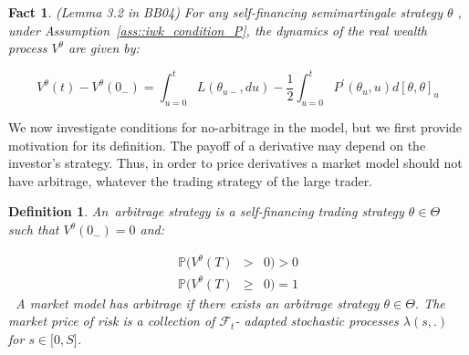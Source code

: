 \documentclass{article}
\newtheorem{definition}{Definition}
\newtheorem{fact}[theorem]{Fact}
\begin{document}


\begin{fact}
(Lemma 3.2 in BB04) For any self-financing semimartingale strategy $\theta $%
, under Assumption~\ref{ass::iwk_condition_P}, the dynamics of the real
wealth process $V^{\theta }$ are given by:
\end{fact}

\begin{equation}
V^{\theta }(t)-V^{\theta }(0_{-})=\int_{u=0}^{t}L(\theta _{u-},du)-\frac{1}{2%
}\int_{u=0}^{t}P^{\prime }(\theta _{u},u)d[\theta ,\theta ]_{u}
\label{lemma32BB04}
\end{equation}%
\bigskip

We now investigate conditions for no-arbitrage in the model, but we first
provide motivation for its definition. The payoff of a derivative may depend
on the investor's strategy. Thus, in order to price derivatives a market
model should not have arbitrage, whatever the trading strategy of the large
trader.

\bigskip


\begin{definition}
An\textit{\ arbitrage strategy} is a self-financing trading strategy $\theta
\in \Theta $ such that $V^{\theta }(0_{-})=0$ and:

\begin{eqnarray*}
\mathbb{P}(V^{\theta }(T) &>&0)>0 \\
\mathbb{P}(V^{\theta }(T) &\geq &0)=1
\end{eqnarray*}%
\bigskip \textbf{\ }A \textit{market model has arbitrage} if there exists an
arbitrage strategy $\theta \in \Theta $. The \textit{market price of risk}
is a collection of $\mathcal{F}_{t}$- adapted stochastic processes $\lambda
(s,.)$ for $s\in \lbrack 0,S]$.
\end{definition}


\end{document}
